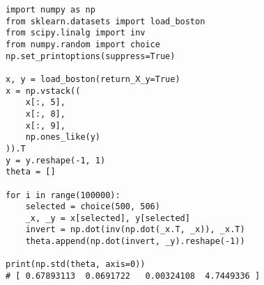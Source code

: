 \lstset{language=Python}
\begin{lstlisting}[caption={波士顿房价问题的共线性问题\label{code:boston_house_price_co_linear}}]
import numpy as np
from sklearn.datasets import load_boston
from scipy.linalg import inv
from numpy.random import choice
np.set_printoptions(suppress=True)

x, y = load_boston(return_X_y=True)
x = np.vstack((
    x[:, 5],
    x[:, 8],
    x[:, 9],
    np.ones_like(y)
)).T
y = y.reshape(-1, 1)
theta = []

for i in range(100000):
    selected = choice(500, 506)
    _x, _y = x[selected], y[selected]
    invert = np.dot(inv(np.dot(_x.T, _x)), _x.T)
    theta.append(np.dot(invert, _y).reshape(-1))

print(np.std(theta, axis=0))
# [ 0.67893113  0.0691722   0.00324108  4.7449336 ]
\end{lstlisting}